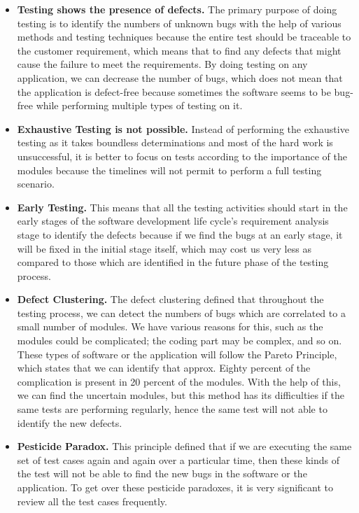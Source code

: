 \documentclass[thesis=M,english,hidelinks]{FITthesis}[2019/12/23]
\begin{document}
\begin{itemize}
	\item \textbf{Testing shows the presence of defects.} The primary purpose of doing testing is to identify the numbers of unknown bugs with the help of various methods and testing techniques because the entire test should be traceable to the customer requirement, which means that to find any defects that might cause the failure to meet the requirements. By doing testing on any application, we can decrease the number of bugs, which does not mean that the application is defect-free because sometimes the software seems to be bug-free while performing multiple types of testing on it.
	\item \textbf{Exhaustive Testing is not possible.} Instead of performing the exhaustive testing as it takes boundless determinations and most of the hard work is unsuccessful, it is better to focus on tests  according to the importance of the modules because the timelines will not permit to perform a full testing scenario.
	\item \textbf{Early Testing.} This means that all the testing activities should start in the early stages of the software development life cycle's requirement analysis stage to identify the defects because if we find the bugs at an early stage, it will be fixed in the initial stage itself, which may cost us very less as compared to those which are identified in the future phase of the testing process.
	\item \textbf{Defect Clustering.} The defect clustering defined that throughout the testing process, we can detect the numbers of bugs which are correlated to a small number of modules. We have various reasons for this, such as the modules could be complicated; the coding part may be complex, and so on. These types of software or the application will follow the Pareto Principle, which states that we can identify that approx. Eighty percent of the complication is present in 20 percent of the modules. With the help of this, we can find the uncertain modules, but this method has its difficulties if the same tests are performing regularly, hence the same test will not able to identify the new defects.
	\item \textbf{Pesticide Paradox.} This principle defined that if we are executing the same set of test cases again and again over a particular time, then these kinds of the test will not be able to find the new bugs in the software or the application. To get over these pesticide paradoxes, it is very significant to review all the test cases frequently.

\end{itemize}
\end{document}

